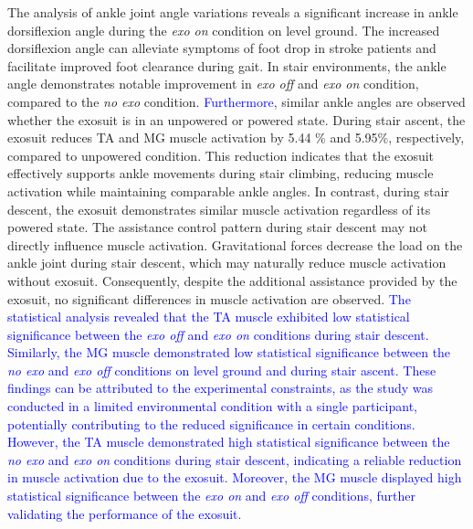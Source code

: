 \documentclass[journal,article,submit,pdftex,moreauthors]{Definitions/mdpi}
\begin{document}
The analysis of ankle joint angle variations reveals a significant increase in ankle dorsiflexion angle during the \textit{exo on} condition on level ground. The increased dorsiflexion angle can alleviate symptoms of foot drop in stroke patients and facilitate improved foot clearance during gait. In stair environments, the ankle angle demonstrates notable improvement in \textit{exo off} and \textit{exo on} condition, compared to the \textit{no exo} condition. \textcolor{blue}{Furthermore}, similar ankle angles are observed whether the exosuit is in an unpowered or powered state. During stair ascent, the exosuit reduces TA and MG muscle activation by 5.44 \% and 5.95\%, respectively, compared to unpowered condition. This reduction indicates that the exosuit effectively supports ankle movements during stair climbing, reducing muscle activation while maintaining comparable ankle angles. In contrast, during stair descent, the exosuit demonstrates similar muscle activation regardless of its powered state. The assistance control pattern during stair descent may not directly influence muscle activation. Gravitational forces decrease the load on the ankle joint during stair descent, which may naturally reduce muscle activation without exosuit. Consequently, despite the additional assistance provided by the exosuit, no significant differences in muscle activation are observed.
\textcolor{blue}{The statistical analysis revealed that the TA muscle exhibited low statistical significance between the \textit{exo off} and \textit{exo on} conditions during stair descent. Similarly, the MG muscle demonstrated low statistical significance between the \textit{no exo} and \textit{exo off} conditions on level ground and during stair ascent. These findings can be attributed to the experimental constraints, as the study was conducted in a limited environmental condition with a single participant, potentially contributing to the reduced significance in certain conditions. However, the TA muscle demonstrated high statistical significance between the \textit{no exo} and \textit{exo on} conditions during stair descent, indicating a reliable reduction in muscle activation due to the exosuit. Moreover, the MG muscle displayed high statistical significance between the \textit{exo on} and \textit{exo off} conditions, further validating the performance of the exosuit.}
\end{document}
